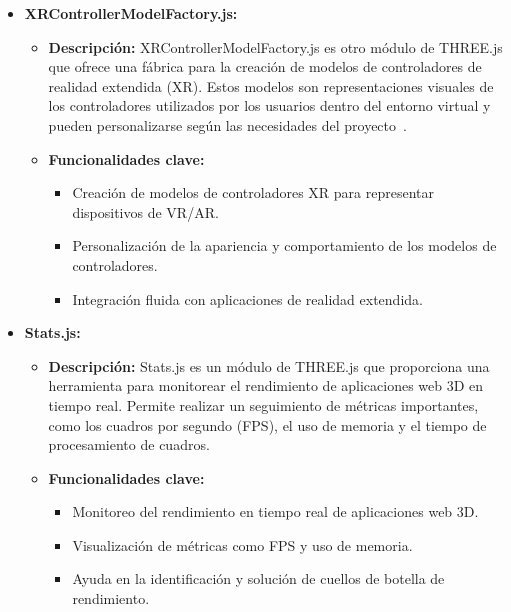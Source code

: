 \documentclass[a4paper, 12pt]{book}
\begin{document}
\begin{itemize}
  \item \textbf{XRControllerModelFactory.js:}
    \begin{itemize}
      \item \textbf{Descripción:} XRControllerModelFactory.js es otro módulo de THREE.js que ofrece una fábrica para la creación de modelos de controladores de 
      realidad extendida (XR). Estos modelos son representaciones visuales de los controladores utilizados por los usuarios dentro del entorno virtual y pueden 
      personalizarse según las necesidades del proyecto~\cite{Documentacion_WebXR}.
      \item \textbf{Funcionalidades clave:}
      \begin{itemize}
        \item Creación de modelos de controladores XR para representar dispositivos de VR/AR.
        \item Personalización de la apariencia y comportamiento de los modelos de controladores.
        \item Integración fluida con aplicaciones de realidad extendida.
      \end{itemize}
    \end{itemize}
  
  \item \textbf{Stats.js:}
    \begin{itemize}
      \item \textbf{Descripción:} Stats.js es un módulo de THREE.js que proporciona una herramienta para monitorear el rendimiento de aplicaciones web 3D en tiempo real. 
      Permite realizar un seguimiento de métricas importantes, como los cuadros por segundo (FPS), el uso de memoria y el tiempo de procesamiento de cuadros.
      \item \textbf{Funcionalidades clave:}
      \begin{itemize}
        \item Monitoreo del rendimiento en tiempo real de aplicaciones web 3D.
        \item Visualización de métricas como FPS y uso de memoria.
        \item Ayuda en la identificación y solución de cuellos de botella de rendimiento.
      \end{itemize}
    \end{itemize}
  

\end{itemize}
\end{document}
